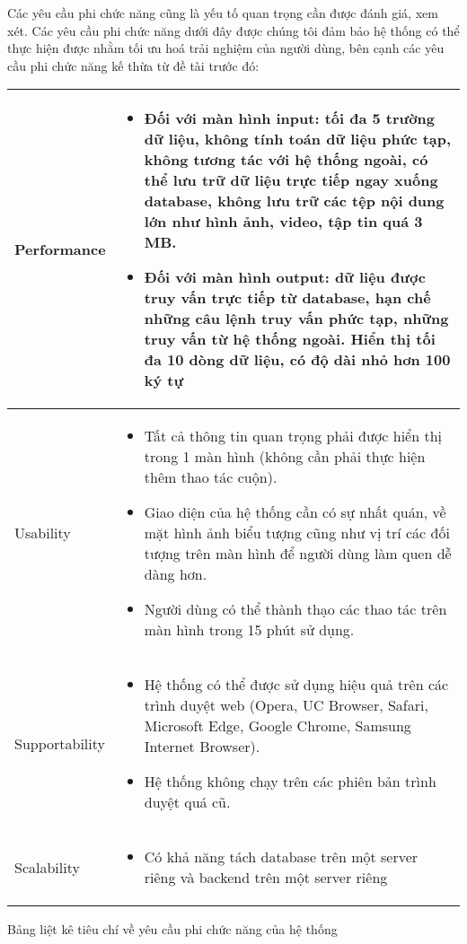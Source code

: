 Các yêu cầu phi chức năng cũng là yếu tố quan trọng cần được đánh giá, xem xét.
Các yêu cầu phi chức năng dưới đây được chúng tôi đảm bảo hệ thống có thể thực
hiện được nhằm tối ưu hoá trải nghiệm của người dùng, bên cạnh các yêu cầu phi
chức năng kế thừa từ đề tài trước đó:
\begin{center}
    \begin{tabular}{ |m{2.5cm}|m{11.5cm}|}
        \hline
        Performance    & 
      \begin{itemize}
            \item Đối với màn hình input: tối đa 5 trường dữ liệu, không tính toán dữ liệu phức tạp, không tương tác với hệ thống ngoài, có thể lưu trữ dữ liệu trực
                  tiếp ngay xuống database, không lưu trữ các tệp nội dung lớn như hình ảnh, video, tập tin quá 3 MB.
            \item Đối với màn hình output: dữ liệu được truy vấn trực tiếp từ database, hạn chế những câu lệnh truy vấn phức tạp, những truy vấn từ hệ thống ngoài.
                  Hiển thị tối đa 10 dòng dữ liệu, có độ dài nhỏ hơn 100 ký tự
      \end{itemize} \\
        \hline
        Usability      & 
        \begin{itemize}
            \item Tất cả thông tin quan trọng phải được hiển thị trong 1 màn hình (không cần phải
                  thực hiện thêm thao tác cuộn).
            \item Giao diện của hệ thống cần có sự nhất quán, về mặt hình ảnh biểu tượng cũng như
                  vị trí các đối tượng trên màn hình để người dùng làm quen dễ dàng hơn.
            \item Người dùng có thể thành thạo các thao tác trên màn hình trong 15 phút sử dụng.
      \end{itemize}\\
        \hline
        Supportability & 
            \begin{itemize}
                  \item Hệ thống có thể được sử dụng hiệu quả trên các trình duyệt web (Opera, UC
                        Browser, Safari, Microsoft Edge, Google Chrome, Samsung Internet Browser).
                  \item Hệ thống không chạy trên các phiên bản trình duyệt quá cũ.
            \end{itemize}\\
        \hline
        Scalability    & 
            \begin{itemize}
                  \item Có khả năng tách database trên một server riêng và backend trên một
                  server riêng
            \end{itemize}\\
        \hline
    \end{tabular}
    \caption{Bảng liệt kê tiêu chí về yêu cầu phi chức năng của hệ thống}
\end{center}
